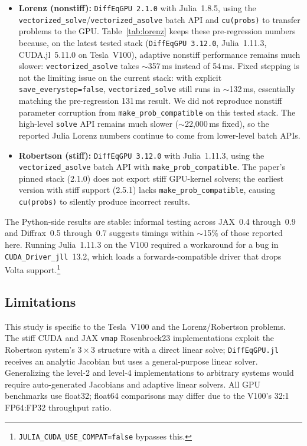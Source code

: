 \documentclass[11pt]{article}
\begin{document}
\begin{itemize}
\item \textbf{Lorenz (nonstiff):} \texttt{DiffEqGPU~2.1.0} with
Julia~1.8.5, using the \texttt{vectorized\_solve}/\texttt{vectorized\_asolve}
batch API and \texttt{cu(probs)} to transfer problems to the GPU.
Table~\ref{tab:lorenz} keeps these pre-regression numbers because,
on the latest tested stack (\texttt{DiffEqGPU~3.12.0},
Julia~1.11.3, CUDA.jl~5.11.0 on Tesla~V100), adaptive nonstiff
performance remains much slower:
\texttt{vectorized\_asolve} takes ${\sim}$357\,ms instead of
54\,ms. Fixed stepping is not the limiting issue on the current
stack: with explicit \texttt{save\_everystep=false},
\texttt{vectorized\_solve} still runs in ${\sim}$132\,ms,
essentially matching the pre-regression 131\,ms result. We did
not reproduce nonstiff parameter corruption from
\texttt{make\_prob\_compatible} on this tested stack. The
high-level \texttt{solve} API remains much slower
(${\sim}$22{,}000\,ms fixed), so the reported Julia Lorenz
numbers continue to come from lower-level batch APIs.

\item \textbf{Robertson (stiff):} \texttt{DiffEqGPU~3.12.0} with
Julia~1.11.3, using the \texttt{vectorized\_asolve} batch API
with \texttt{make\_prob\_compatible}.
The paper's pinned stack (2.1.0) does not export stiff GPU-kernel
solvers; the earliest version with stiff support (2.5.1) lacks
\texttt{make\_prob\_compatible}, causing \texttt{cu(probs)} to
silently produce incorrect results.
\end{itemize}

The Python-side results are stable: informal testing across
JAX~0.4 through~0.9 and Diffrax~0.5 through~0.7 suggests timings
within ${\sim}$15\% of those reported here.
Running Julia~1.11.3 on the V100 required a workaround
for a bug in \texttt{CUDA\_Driver\_jll}~13.2, which loads a
forwards-compatible driver that drops Volta
support.\footnote{\texttt{JULIA\_CUDA\_USE\_COMPAT=false}
bypasses this.}

\subsection{Limitations}

This study is specific to the Tesla~V100 and the
Lorenz/Robertson problems.
The stiff CUDA and JAX \texttt{vmap} Rosenbrock23 implementations
exploit the Robertson system's $3 \times 3$ structure with a
direct linear solve; \texttt{DiffEqGPU.jl} receives an analytic
Jacobian but uses a general-purpose linear solver.
Generalizing the level-2 and level-4 implementations to
arbitrary systems would require auto-generated Jacobians and
adaptive linear solvers.
All GPU benchmarks use float32; float64 comparisons may
differ due to the V100's 32:1 FP64:FP32 throughput ratio.
\end{document}

